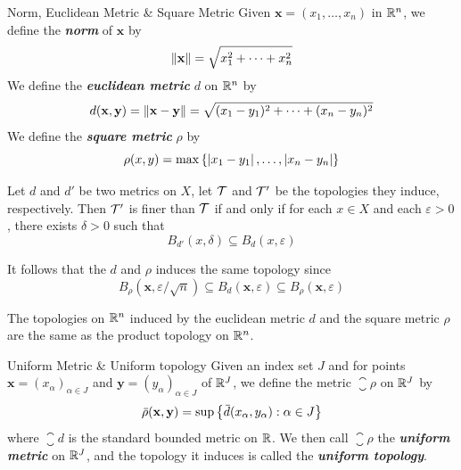 \documentclass[12pt,a4paper]{article}
\begin{document}
    \begin{defi}{Norm, Euclidean Metric \& Square Metric}
        Given $\mathbf{x}=(x_1,\dots,x_n)$ in $\mathbb{R}^n$, we define the \textbf{\textit{norm}} of $\mathbf{x}$ by
        $$
        \left\lVert \mathbf{x}\right\rVert=\sqrt{x_1^2+\cdots+x_n^2}
        $$
        We define the \textbf{\textit{euclidean metric}} $d$ on $\mathbb{R}^n$ by
        $$
        d(\mathbf{x},\mathbf{y})=\left\lVert \mathbf{x}-\mathbf{y}\right\rVert=\sqrt{(x_1-y_1)^2+\cdots+(x_n-y_n)^2}
        $$
        We define the \textbf{\textit{square metric}} $\rho$ by
        $$
        \rho(x,y)=\max\left\{\left\lvert x_1-y_1\right\rvert,\dots,\left\lvert x_n-y_n\right\rvert\right\}
        $$
    \end{defi}
    \hfill

    \begin{lemma}
        Let $d$ and $d'$ be two metrics on $X$, let $\mathcal{T}$ and $\mathcal{T}'$ be the topologies they induce, respectively. Then $\mathcal{T}'$ is finer than $\mathcal{T}$ if and only if for each $x\in X$ and each $\varepsilon>0$, there exists $\delta>0$ such that
        $$
        B_{d'}(x,\delta)\subseteq B_d(x,\varepsilon)
        $$
    \end{lemma}
    \begin{remark}
        It follows that the $d$ and $\rho$ induces the same topology since
        $$
        B_\rho(\mathbf{x},\varepsilon/\sqrt{n})\subseteq B_d(\mathbf{x},\varepsilon)\subseteq B_\rho(\mathbf{x},\varepsilon)
        $$
    \end{remark}
    \hfill

    \begin{thm}
        The topologies on $\mathbb{R}^n$ induced by the euclidean metric $d$ and the square metric $\rho$ are the same as the product topology on $\mathbb{R}^n$.
    \end{thm}
    \hfill

    \begin{defi}{Uniform Metric \& Uniform topology}
        Given an index set $J$ and for points $\mathbf{x}=(x_\alpha)_{\alpha\in J}$ and $\mathbf{y}=(y_\alpha)_{\alpha\in J}$ of $\mathbb{R}^J$, we define the metric $\closure{\rho}$ on $\mathbb{R}^J$ by
        $$
        {}\mkern3mu\overline{\mkern-3mu\rho}(\mathbf{x},\mathbf{y})=\sup\left\{{}\mkern3mu\overline{\mkern-3mud}(x_\alpha,y_\alpha):\alpha\in J\right\}
        $$
        where $\closure{d}$ is the standard bounded metric on $\mathbb{R}$. We then call $\closure{\rho}$ the \textbf{\textit{uniform metric}} on $\mathbb{R}^J$, and the topology it induces is called the \textbf{\textit{uniform topology}}.
    \end{defi}
    \hfill
\end{document}
